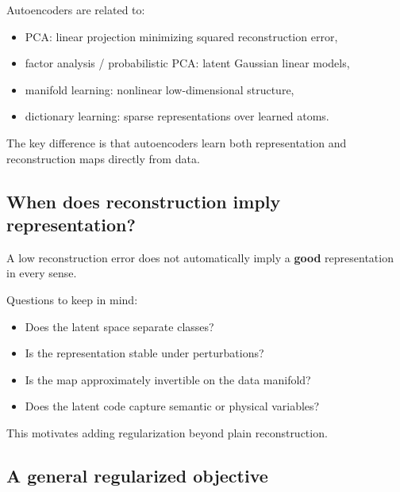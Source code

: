 \documentclass[%
oneside,                 %
final,                   %
10pt]{article}
\begin{document}
\begin{block}{Autoencoders are related to: }
\begin{itemize}
\item PCA: linear projection minimizing squared reconstruction error,

\item factor analysis / probabilistic PCA: latent Gaussian linear models,

\item manifold learning: nonlinear low-dimensional structure,

\item dictionary learning: sparse representations over learned atoms.
\end{itemize}

\noindent
\end{block}
The key difference is that autoencoders learn both representation and reconstruction maps directly from data.

\subsection{When does reconstruction imply representation?}

A low reconstruction error does not automatically imply a \textbf{good} representation in every sense.

\begin{block}{Questions to keep in mind: }
\begin{itemize}
\item Does the latent space separate classes?

\item Is the representation stable under perturbations?

\item Is the map approximately invertible on the data manifold?

\item Does the latent code capture semantic or physical variables?
\end{itemize}

\noindent
\end{block}
This motivates adding regularization beyond plain reconstruction.

\subsection{A general regularized objective}
\end{document}
